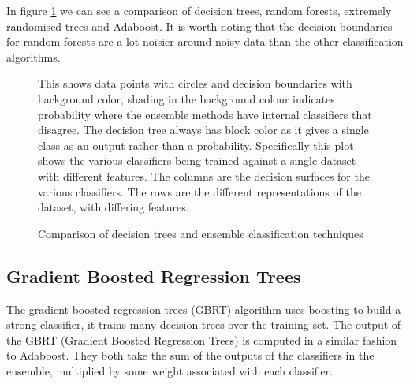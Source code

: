 \documentclass[ %
                    author={Sam Phippen},
                supervisor={Dr. Rafal Bogacz},
                     title={Real time voice activity detectors in noisy personal computing environments},
                  subtitle={},
                    degree={MEng},
                      year={2012} ]{thesis}
\begin{document}
In figure \ref{fig:comparison} we can see a comparison of decision trees,
random forests, extremely randomised trees and Adaboost. It is worth noting
that the decision boundaries for random forests are a lot noisier around noisy
data than the other classification algorithms.

\begin{figure}

    \caption{Comparison
    of decision trees and ensemble classification techniques}

    This shows data points with circles and decision boundaries with background
    color, shading in the background colour indicates probability where the
    ensemble methods have internal classifiers that disagree. The decision tree
    always has block color as it gives a single class as an output rather than
    a probability. Specifically this plot shows the various classifiers being
    trained against a single dataset with different features. The columns
    are the decision surfaces for the various classifiers. The rows are the
    different representations of the dataset, with differing features.

    \label{fig:comparison}

\end{figure}

\subsection{Gradient Boosted Regression Trees}

The gradient boosted regression trees (GBRT) algorithm uses boosting to build a
strong classifier, it trains many decision trees over the training set.  The
output of the GBRT (Gradient Boosted Regression Trees) is computed in a similar
fashion to Adaboost. They both take the sum of the outputs of the classifiers
in the ensemble, multiplied by some weight associated with each classifier. 
\end{document}
